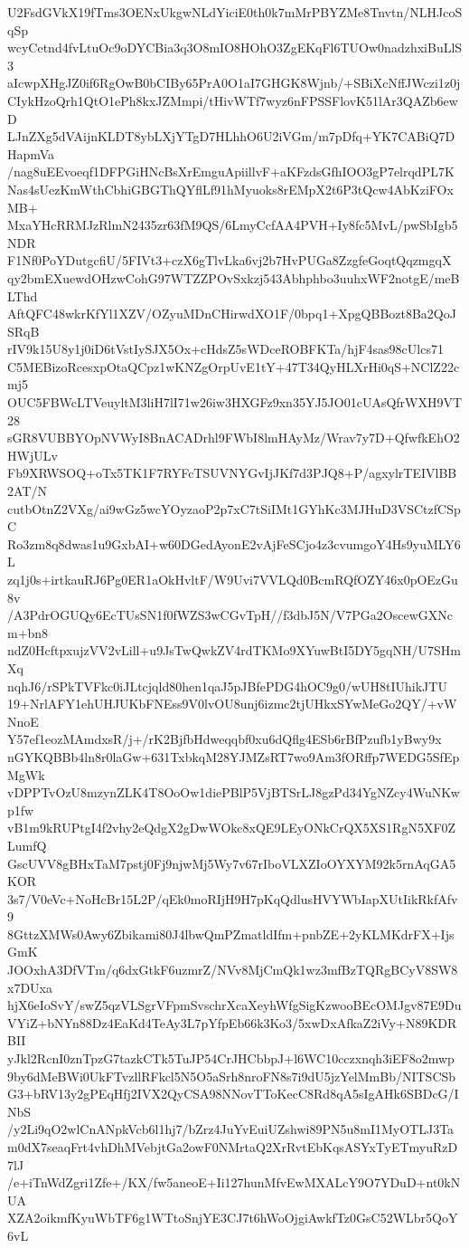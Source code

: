 U2FsdGVkX19fTms3OENxUkgwNLdYiciE0th0k7mMrPBYZMe8Tnvtn/NLHJcoSqSp
wcyCetnd4fvLtuOc9oDYCBia3q3O8mIO8HOhO3ZgEKqFl6TUOw0nadzhxiBuLlS3
aIcwpXHgJZ0if6RgOwB0bCIBy65PrA0O1aI7GHGK8Wjnb/+SBiXcNffJWczi1z0j
CIykHzoQrh1QtO1ePh8kxJZMmpi/tHivWTf7wyz6nFPSSFlovK51lAr3QAZb6ewD
LJnZXg5dVAijnKLDT8ybLXjYTgD7HLhhO6U2iVGm/m7pDfq+YK7CABiQ7DHapmVa
/nag8uEEvoeqf1DFPGiHNcBsXrEmguApiillvF+aKFzdsGfhIOO3gP7elrqdPL7K
Nas4sUezKmWthCbhiGBGThQYflLf91hMyuoks8rEMpX2t6P3tQcw4AbKziFOxMB+
MxaYHcRRMJzRlmN2435zr63fM9QS/6LmyCcfAA4PVH+Iy8fc5MvL/pwSbIgb5NDR
F1Nf0PoYDutgcfiU/5FIVt3+czX6gTlvLka6vj2b7HvPUGa8ZzgfeGoqtQqzmgqX
qy2bmEXuewdOHzwCohG97WTZZPOvSxkzj543Abhphbo3uuhxWF2notgE/meBLThd
AftQFC48wkrKfYl1XZV/OZyuMDnCHirwdXO1F/0bpq1+XpgQBBozt8Ba2QoJSRqB
rIV9k15U8y1j0iD6tVstIySJX5Ox+cHdsZ5sWDceROBFKTa/hjF4sas98cUlcs71
C5MEBizoRcesxpOtaQCpz1wKNZgOrpUvE1tY+47T34QyHLXrHi0qS+NClZ22cmj5
OUC5FBWcLTVeuyltM3liH7lI71w26iw3HXGFz9xn35YJ5JO01cUAsQfrWXH9VT28
sGR8VUBBYOpNVWyI8BnACADrhl9FWbI8lmHAyMz/Wrav7y7D+QfwfkEhO2HWjULv
Fb9XRWSOQ+oTx5TK1F7RYFcTSUVNYGvIjJKf7d3PJQ8+P/agxylrTEIVlBB2AT/N
cutbOtnZ2VXg/ai9wGz5wcYOyzaoP2p7xC7tSiIMt1GYhKc3MJHuD3VSCtzfCSpC
Ro3zm8q8dwas1u9GxbAI+w60DGedAyonE2vAjFeSCjo4z3cvumgoY4Hs9yuMLY6L
zq1j0s+irtkauRJ6Pg0ER1aOkHvltF/W9Uvi7VVLQd0BcmRQfOZY46x0pOEzGu8v
/A3PdrOGUQy6EcTUsSN1f0fWZS3wCGvTpH//f3dbJ5N/V7PGa2OscewGXNcm+bn8
ndZ0HcftpxujzVV2vLill+u9JsTwQwkZV4rdTKMo9XYuwBtI5DY5gqNH/U7SHmXq
nqhJ6/rSPkTVFkc0iJLtcjqld80hen1qaJ5pJBfePDG4hOC9g0/wUH8tIUhikJTU
19+NrlAFY1ehUHJUKbFNEss9V0lvOU8unj6izmc2tjUHkxSYwMeGo2QY/+vWNnoE
Y57ef1eozMAmdxsR/j+/rK2BjfbHdweqqbf0xu6dQflg4ESb6rBfPzufb1yBwy9x
nGYKQBBb4ln8r0laGw+631TxbkqM28YJMZsRT7wo9Am3fORffp7WEDG5SfEpMgWk
vDPPTvOzU8mzynZLK4T8OoOw1diePBlP5VjBTSrLJ8gzPd34YgNZcy4WuNKwp1fw
vB1m9kRUPtgI4f2vhy2eQdgX2gDwWOkc8xQE9LEyONkCrQX5XS1RgN5XF0ZLumfQ
GscUVV8gBHxTaM7pstj0Fj9njwMj5Wy7v67rIboVLXZIoOYXYM92k5rnAqGA5KOR
3s7/V0eVc+NoHcBr15L2P/qEk0moRIjH9H7pKqQdlusHVYWbIapXUtIikRkfAfv9
8GttzXMWs0Awy6Zbikami80J4lbwQmPZmatldIfm+pnbZE+2yKLMKdrFX+IjsGmK
JOOxhA3DfVTm/q6dxGtkF6uzmrZ/NVv8MjCmQk1wz3mfBzTQRgBCyV8SW8x7DUxa
hjX6eIoSvY/swZ5qzVLSgrVFpmSvschrXcaXeyhWfgSigKzwooBEcOMJgv87E9Du
VYiZ+bNYn88Dz4EaKd4TeAy3L7pYfpEb66k3Ko3/5xwDxAfkaZ2iVy+N89KDRBII
yJkl2RcnI0znTpzG7tazkCTk5TuJP54CrJHCbbpJ+l6WC10cczxnqh3iEF8o2mwp
9by6dMeBWi0UkFTvzllRFkcl5N5O5aSrh8nroFN8s7i9dU5jzYelMmBb/NITSCSb
G3+bRV13y2gPEqHfj2IVX2QyCSA98NNovTToKecC8Rd8qA5sIgAHk6SBDcG/INbS
/y2Li9qO2wlCnANpkVcb6l1hj7/bZrz4JuYvEuiUZshwi89PN5u8mI1MyOTLJ3Ta
m0dX7seaqFrt4vhDhMVebjtGa2owF0NMrtaQ2XrRvtEbKqsASYxTyETmyuRzD7lJ
/e+iTnWdZgri1Zfe+/KX/fw5aneoE+Ii127hunMfvEwMXALcY9O7YDuD+nt0kNUA
XZA2oikmfKyuWbTF6g1WTtoSnjYE3CJ7t6hWoOjgiAwkfTz0GsC52WLbr5QoY6vL
